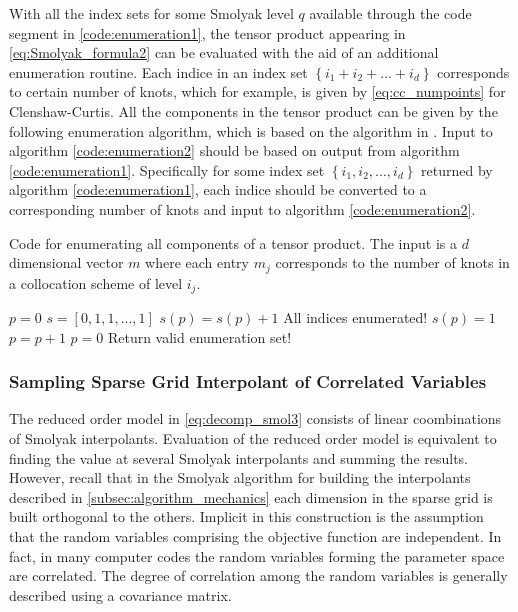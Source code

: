 With all the index sets for some Smolyak level $q$ available through the code segment in \ref{code:enumeration1}, the tensor product appearing in \ref{eq:Smolyak_formula2} can be evaluated with the aid of an additional enumeration routine. Each indice in an index set $\left\{i_1+i_2+...+i_d\right\}$ corresponds to certain number of knots, which for example, is given by \ref{eq:cc_numpoints} for Clenshaw-Curtis. All the components in the tensor product can be given by the following enumeration algorithm, which is based on the algorithm in \cite{Holtz}. Input to algorithm \ref{code:enumeration2} should be based on output from algorithm \ref{code:enumeration1}. Specifically for some index set $\left\{i_1,i_2,...,i_d\right\}$ returned by algorithm \ref{code:enumeration1}, each indice should be converted to a corresponding number of knots and input to algorithm \ref{code:enumeration2}.     
\begin{algorithm}
\caption{\label{code:enumeration2} 
Code for enumerating all components of a tensor product. The input is a $d$ dimensional vector $m$ where each entry $m_j$ corresponds to the number of knots in a collocation scheme of level $i_j$.} 
\begin{algorithmic}[1]
\State $p = 0$
\State $s = \left[0,1,1,...,1\right]$  
\Repeat 
   \State $s(p) = s(p) + 1$
         \State All indices enumerated!
      \Else
         \State $s(p) = 1$
         \State $p = p + 1$
      \EndIf
   \Else
      \State $p = 0$
      \State Return valid enumeration set!
   \EndIf
{} 
\end{algorithmic}
\end{algorithm}

\subsubsection{Sampling Sparse Grid Interpolant of Correlated Variables} \label{subsubsec:sampling_smolyak}

The reduced order model in \ref{eq:decomp_smol3} consists of linear coombinations of Smolyak interpolants. Evaluation of the reduced order model is equivalent to finding the value at several Smolyak interpolants and summing the results. However, recall that in the Smolyak algorithm for building the interpolants described in \ref{subsec:algorithm_mechanics} each dimension in the sparse grid is built orthogonal to the others. Implicit in this construction is the assumption that the random variables comprising the objective function are independent. In fact, in many computer codes the random variables forming the parameter space are correlated. The degree of correlation among the random variables is generally described using a covariance matrix. 

